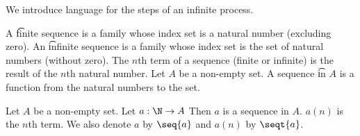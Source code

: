

We introduce language for the steps of an infinite process.


A \t{finite sequence} is a family whose index set is a natural number (excluding zero).
An \t{infinite sequence} is a family whose index set is the set of natural numbers (without zero).
The \t{$n$th term} of a sequence (finite or infinite) is the result of the $n$th natural number.
Let $A$ be a non-empty set.
A sequence \t{in} $A$ is a function from the natural numbers to the set.


Let $A$ be a non-empty set.
Let $a: \N \to A$
Then $a$ is a sequence in $A$.
$a(n)$ is the $n$th term.
We also denote $a$ by
$\seq{a}$ and $a(n)$ by $\seqt{a}$.

\blankpage

%

